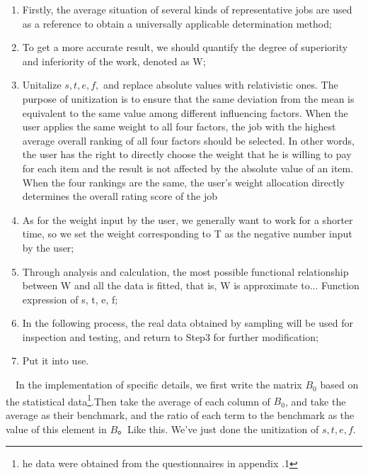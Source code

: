 \documentclass[12pt]{article}
\begin{document}
\begin{enumerate}
    \item Firstly, the average situation of several kinds of representative jobs are used as a reference to obtain a universally applicable determination method;
    \item To get a more accurate result, we should quantify the degree of superiority and inferiority of the work, denoted as W;%
    \item Unitalize $s, t, e, f,$ and replace absolute values with relativistic ones. The purpose of unitization is to ensure that the same deviation from the mean is equivalent to the same value among different influencing factors. When the user applies the same weight to all four factors, the job with the highest average overall ranking of all four factors should be selected. In other words, the user has the right to directly choose the weight that he is willing to pay for each item and the result is not affected by the absolute value of an item. When the four rankings are the same, the user's weight allocation directly determines the overall rating score of the job%
    \item As for the weight input by the user, we generally want to work for a shorter time, so we set the weight corresponding to T as the negative number input by the user;%
    \item Through analysis and calculation, the most possible functional relationship between W and all the data is fitted, that is, W is approximate to... Function expression of s, t, e, f;%
    \item In the following process, the real data obtained by sampling will be used for inspection and testing, and return to Step3 for further modification;%
    \item Put it into use.%
\end{enumerate}
%
~~In the implementation of specific details, we first write the matrix $B_{0}$ based on the statistical data\footnote[2]{he data were obtained from the questionnaires in appendix .1}.Then take the average of each column of $B_{0}$, and take the average as their benchmark, and the ratio of each term to the benchmark as the value of this element in $B$。Like this. We've just done the unitization of $s, t, e, f$. 
\end{document}
